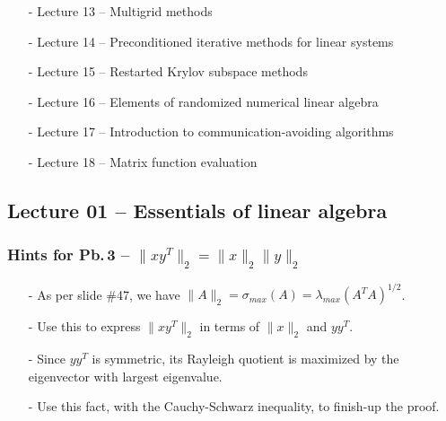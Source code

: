 \documentclass[letterpaper,10pt]{article}
\begin{document}
\begin{itemize}
\item[-] Lecture 13 -- Multigrid methods\vspace{-.15cm}
\item[-] Lecture 14 -- Preconditioned iterative methods for linear systems\vspace{-.15cm}
\item[-] Lecture 15 -- Restarted Krylov subspace methods\vspace{-.15cm}
\item[-] Lecture 16 -- Elements of randomized numerical linear algebra\vspace{-.15cm}
\item[-] Lecture 17 -- Introduction to communication-avoiding algorithms\vspace{-.15cm}
\item[-] Lecture 18 -- Matrix function evaluation
\end{itemize}

\subsection*{Lecture 01 -- Essentials of linear algebra}
\subsubsection*{Hints for Pb.$\,$3 -- $\|xy^T\|_2=\|x\|_2\|y\|_2$}
\begin{itemize}
\item[-] As per slide \#47, we have $\|A\|_2=\sigma_{max}(A)=\lambda_{max}(A^TA)^{1/2}$.
\item[-] Use this to express $\|xy^T\|_2$ in terms of $\|x\|_2$ and $yy^T$.
\item[-] Since $yy^T$ is symmetric, its Rayleigh quotient is maximized by the eigenvector with largest eigenvalue.
\item[-] Use this fact, with the Cauchy-Schwarz inequality, to finish-up the proof.
\end{itemize}
\end{document}
